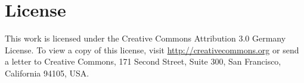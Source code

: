 \documentclass[ITR, MA, english, final]{LSR_thesis}
\begin{document}
\appendix



\cleardoublepage
{}
{} 
\listoffigures 	

\cleardoublepage
{}
{} 
\listoftables

\ifdefined\AddMyGloss
    \AddMyGloss 
\fi

\cleardoublepage
{}
{}



\cleardoublepage
\chapter*{License}
This work is licensed under the Creative Commons Attribution 3.0 Germany License. To view a copy of this license, visit \href{http://creativecommons.org/licenses/by/3.0/de/}{http://creativecommons.org} or send a letter to Creative Commons, 171 Second Street, Suite 300, San Francisco, California 94105, USA.

\listoftodos
\end{document}
